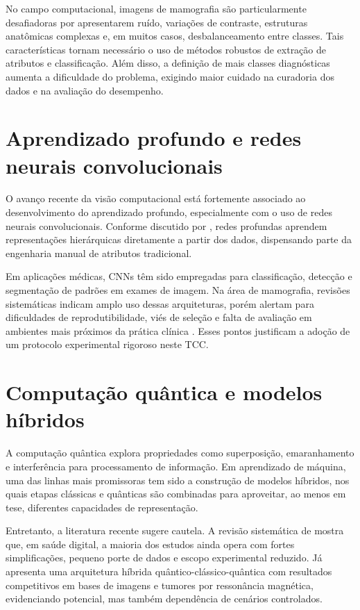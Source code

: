\documentclass[
    12pt,
    openright,
    oneside,
    a4paper,
    english,
    brazil
]{abntex2}
\begin{document}
No campo computacional, imagens de mamografia são particularmente desafiadoras por apresentarem ruído, variações de contraste, estruturas anatômicas complexas e, em muitos casos, desbalanceamento entre classes. Tais características tornam necessário o uso de métodos robustos de extração de atributos e classificação. Além disso, a definição de mais classes diagnósticas aumenta a dificuldade do problema, exigindo maior cuidado na curadoria dos dados e na avaliação do desempenho.

\section{Aprendizado profundo e redes neurais convolucionais}

O avanço recente da visão computacional está fortemente associado ao desenvolvimento do aprendizado profundo, especialmente com o uso de redes neurais convolucionais. Conforme discutido por , redes profundas aprendem representações hierárquicas diretamente a partir dos dados, dispensando parte da engenharia manual de atributos tradicional.

Em aplicações médicas, CNNs têm sido empregadas para classificação, detecção e segmentação de padrões em exames de imagem. Na área de mamografia, revisões sistemáticas indicam amplo uso dessas arquiteturas, porém alertam para dificuldades de reprodutibilidade, viés de seleção e falta de avaliação em ambientes mais próximos da prática clínica \cite{Bhalla2023MammographyReview}. Esses pontos justificam a adoção de um protocolo experimental rigoroso neste TCC.

\section{Computação quântica e modelos híbridos}

A computação quântica explora propriedades como superposição, emaranhamento e interferência para processamento de informação. Em aprendizado de máquina, uma das linhas mais promissoras tem sido a construção de modelos híbridos, nos quais etapas clássicas e quânticas são combinadas para aproveitar, ao menos em tese, diferentes capacidades de representação.

Entretanto, a literatura recente sugere cautela. A revisão sistemática de  mostra que, em saúde digital, a maioria dos estudos ainda opera com fortes simplificações, pequeno porte de dados e escopo experimental reduzido. Já  apresenta uma arquitetura híbrida quântico-clássico-quântica com resultados competitivos em bases de imagens e tumores por ressonância magnética, evidenciando potencial, mas também dependência de cenários controlados.
\end{document}
